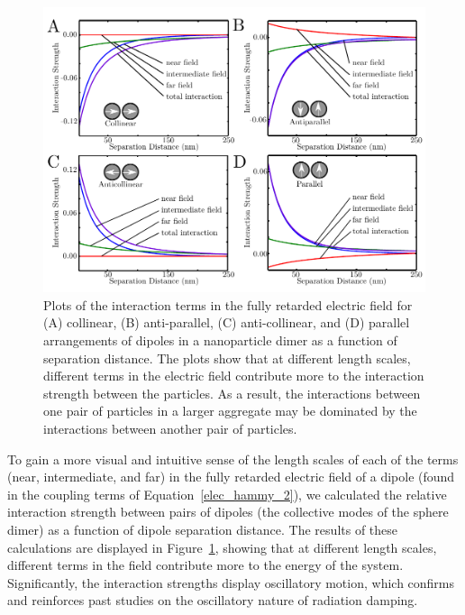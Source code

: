 \documentclass[journal=apchd5,manuscript=article]{achemso}
\begin{document}
\begin{figure}
\begin{center}
\includegraphics{interactions.pdf}
\caption{Plots of the interaction terms in the fully retarded electric field for (A) collinear, (B) anti-parallel, (C) anti-collinear, and (D) parallel arrangements of dipoles in a nanoparticle dimer as a function of separation distance. The plots show that at different length scales, different terms in the electric field contribute more to the interaction strength between the particles. As a result, the interactions between one pair of particles in a larger aggregate may be dominated by the interactions between another pair of particles.}
\label{int_strength}
\end{center}
\end{figure}

To gain a more visual and intuitive sense of the length scales of each of the terms (near, intermediate, and far) in the fully retarded electric field of a dipole (found in the coupling terms of Equation~\ref{elec_hammy_2}), we calculated the relative interaction strength between pairs of dipoles (the collective modes of the sphere dimer) as a function of dipole separation distance. The results of these calculations are displayed in Figure~\ref{int_strength}, showing that at different length scales, different terms in the field contribute more to the energy of the system. Significantly, the interaction strengths display oscillatory motion, which confirms and reinforces past studies on the oscillatory nature of radiation damping.\cite{vonPlessen2007}
\end{document}
